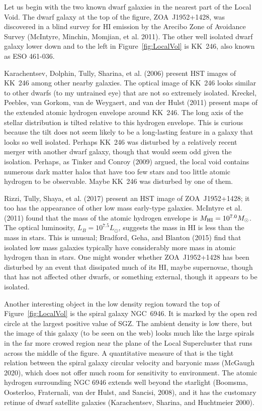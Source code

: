\documentclass[fleqn,12pt]{article}
\begin{document}
Let us begin with the two known dwarf galaxies in the nearest part of the Local Void. The dwarf galaxy at the top of the figure, ZOA~J1952+1428, was discovered in a blind survey for HI emission by the Arecibo Zone of Avoidance Survey (McIntyre, Minchin, Momjian, et al. 2011). The other well isolated dwarf galaxy lower down and to the left in Figure~\ref{fig:LocalVol} is KK~246, also known as ESO 461-036. 

Karachentsev, Dolphin, Tully, Sharina, et al. (2006) present HST images of KK~246 among other nearby galaxies. The optical image of KK~246 looks similar to other dwarfs (to my untrained eye) that are not so extremely isolated. Kreckel, Peebles, van Gorkom, van de Weygaert, and van der Hulst (2011) present maps of the extended atomic hydrogen envelope around KK~246. The long axis of the stellar distribution is tilted relative to this hydrogen envelope. This is curious because the tilt does not seem likely to be a long-lasting feature in a galaxy that looks so well isolated. Perhaps KK~246 was disturbed by a relatively recent merger with another dwarf galaxy, though that would seem odd given the isolation. Perhaps, as Tinker and Conroy (2009) argued, the local void contains numerous dark matter halos that have too few stars and too little atomic hydrogen to be observable. Maybe KK~246 was disturbed by one of them. 

Rizzi, Tully, Shaya, et al. (2017) present an HST image of ZOA~J1952+1428; it too has the appearance of other low mass early-type galaxies. McIntyre et al. (2011) found that the mass of the atomic hydrogen envelope is $M_{\rm HI}=10^{7.0}M_\odot$. The optical luminosity, $L_B=10^{7.5}L_\odot$, suggests the mass in HI is less than the mass in stars. This is unusual; Bradford, Geha, and Blanton (2015) find that isolated low mass  galaxies typically have considerably more mass in atomic hydrogen than in stars.  One might wonder whether ZOA~J1952+1428 has been disturbed by an event that dissipated much of its HI, maybe supernovae, though that has not affected other dwarfs, or something external, though it appears to be isolated.

Another interesting object in the low density region toward the top of Figure~\ref{fig:LocalVol} is the spiral galaxy NGC~6946. It is marked by the open red circle at the largest positive value of SGZ. The ambient density is low there, but the image of this galaxy (to be seen on the web) looks much like the large spirals in the far more crowed region near the plane of the Local Supercluster that runs across the middle of the figure. A quantitative measure of that is the tight relation between the spiral galaxy circular velocity and baryonic mass (McGaugh 2020), which does not offer much room for sensitivity to environment. The atomic hydrogen surrounding NGC 6946 extends well beyond the starlight (Boomsma, Oosterloo, Fraternali, van der Hulst, and Sancisi, 2008), and it has the customary retinue of dwarf satellite galaxies (Karachentsev, Sharina, and Huchtmeier 2000). 
\end{document}
